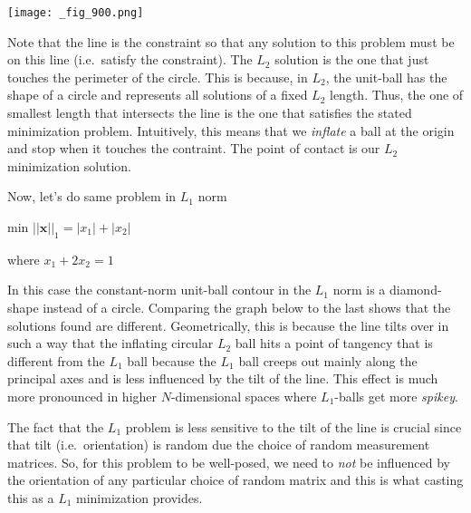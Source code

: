 \documentclass[letterpaper,10pt,english]{/usr/lib/python2.7/site-packages/sphinx/texinputs/sphinxhowto}
\newenvironment{InvisibleVerbatim}
        {\begin{mdframed}[leftmargin=0.1\linewidth,innerleftmargin=3pt,innerrightmargin=3pt, userdefinedwidth=1\linewidth, linewidth=0pt, linecolor=white, usetwoside=false]}
        {\end{mdframed}}
\begin{document}
    

        
        

            
                \begin{InvisibleVerbatim}
                \vspace{-0.5\baselineskip}\begin{center}
    \texttt{[image: \_fig\_900.png]}
    \par
    \end{center}
            \end{InvisibleVerbatim}
            
        
    
Note that the line is the constraint so that any solution to this
problem must be on this line (i.e.~satisfy the constraint). The $L_2$
solution is the one that just touches the perimeter of the circle. This
is because, in $L_2$, the unit-ball has the shape of a circle and
represents all solutions of a fixed $L_2$ length. Thus, the one of
smallest length that intersects the line is the one that satisfies the
stated minimization problem. Intuitively, this means that we
\emph{inflate} a ball at the origin and stop when it touches the
contraint. The point of contact is our $L_2$ minimization solution.

Now, let's do same problem in $L_1$ norm

min $||\mathbf{x}||_1=|x_1|+|x_2|$

where $x_1 + 2 x_2 = 1$

In this case the constant-norm unit-ball contour in the $L_1$ norm is a
diamond-shape instead of a circle. Comparing the graph below to the last
shows that the solutions found are different. Geometrically, this is
because the line tilts over in such a way that the inflating circular
$L_2$ ball hits a point of tangency that is different from the $L_1$
ball because the $L_1$ ball creeps out mainly along the principal axes
and is less influenced by the tilt of the line. This effect is much more
pronounced in higher $N$-dimensional spaces where $L_1$-balls get more
\emph{spikey}.

The fact that the $L_1$ problem is less sensitive to the tilt of the
line is crucial since that tilt (i.e.~orientation) is random due the
choice of random measurement matrices. So, for this problem to be
well-posed, we need to \emph{not} be influenced by the orientation of
any particular choice of random matrix and this is what casting this as
a $L_1$ minimization provides.
\end{document}
